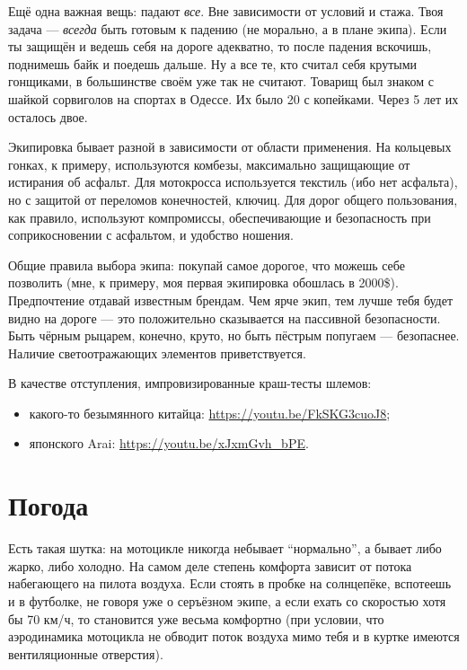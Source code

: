 \documentclass[12pt,a4paper]{article}
\begin{document}
Ещё одна важная вещь: падают \emph{все}. Вне зависимости от условий и
стажа. Твоя задача --- \emph{всегда} быть готовым к падению (не морально,
а в плане экипа). Если ты защищён и ведешь себя на дороге адекватно,
то после падения вскочишь, поднимешь байк и поедешь дальше. Ну а все
те, кто считал себя крутыми гонщиками, в большинстве своём уже так не
считают. Товарищ был знаком с шайкой сорвиголов на спортах в Одессе.
Их было 20 с копейками. Через 5 лет их осталось двое.

Экипировка бывает разной в зависимости от области применения. На
кольцевых гонках, к примеру, используются комбезы, максимально
защищающие от истирания об асфальт. Для мотокросса используется
текстиль (ибо нет асфальта), но с защитой от переломов конечностей,
ключиц. Для дорог общего пользования, как правило, используют
компромиссы, обеспечивающие и безопасность при соприкосновении с
асфальтом, и удобство ношения.

Общие правила выбора экипа: покупай самое дорогое, что можешь себе
позволить (мне, к примеру, моя первая экипировка обошлась в 2000\$).
Предпочтение отдавай известным брендам. Чем ярче экип, тем лучше тебя
будет видно на дороге --- это положительно сказывается на пассивной
безопасности. Быть чёрным рыцарем, конечно, круто, но быть пёстрым
попугаем --- безопаснее. Наличие светоотражающих элементов
приветствуется.

В качестве отступления, импровизированные краш-тесты шлемов:

\begin{itemize}
\item какого-то безымянного китайца:
\url{https://youtu.be/FkSKG3cuoJ8};
\item японского Arai:
\url{https://youtu.be/xJxmGvh_bPE}.
\end{itemize}

\section{Погода}

Есть такая шутка: на
мотоцикле никогда небывает ``нормально'', а бывает либо жарко, либо
холодно. На самом деле степень комфорта зависит от потока набегающего
на пилота воздуха. Если стоять в пробке на солнцепёке, вспотеешь и в
футболке, не говоря уже о серъёзном экипе, а если ехать со скоростью
хотя бы 70 км/ч, то становится уже весьма комфортно (при условии, что
аэродинамика мотоцикла не обводит поток воздуха мимо тебя и в куртке
имеются вентиляционные отверстия).
\end{document}
